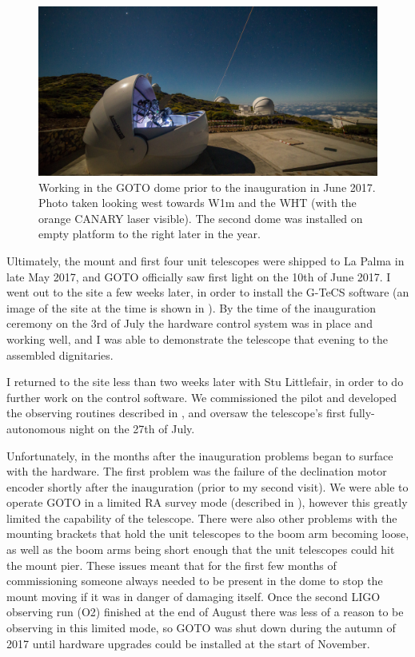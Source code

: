 \begin{colsection}
\begin{figure}[t]
    \begin{center}
        \includegraphics[width=\linewidth]{images/inauguration_photo.jpg}
    \end{center}
    \caption[Working in the GOTO dome prior to the inauguration in June 2017]{
        Working in the GOTO dome prior to the inauguration in June 2017.
        Photo taken looking west towards W1m and the WHT (with the orange CANARY laser visible). The second dome was installed on empty platform to the right later in the year.
    }\label{fig:inauguration}
\end{figure}

Ultimately, the mount and first four unit telescopes were shipped to La Palma in late May 2017, and GOTO officially saw first light on the 10th of June 2017. I went out to the site a few weeks later, in order to install the G-TeCS software (an image of the site at the time is shown in ). By the time of the inauguration ceremony on the 3rd of July the hardware control system was in place and working well, and I was able to demonstrate the telescope that evening to the assembled dignitaries.

I returned to the site less than two weeks later with Stu Littlefair, in order to do further work on the control software. We commissioned the pilot and developed the observing routines described in , and oversaw the telescope's first fully-autonomous night on the 27th of July.

Unfortunately, in the months after the inauguration problems began to surface with the hardware. The first problem was the failure of the declination motor encoder shortly after the inauguration (prior to my second visit). We were able to operate GOTO in a limited RA survey mode (described in ), however this greatly limited the capability of the telescope. There were also other problems with the mounting brackets that hold the unit telescopes to the boom arm becoming loose, as well as the boom arms being short enough that the unit telescopes could hit the mount pier. These issues meant that for the first few months of commissioning someone always needed to be present in the dome to stop the mount moving if it was in danger of damaging itself. Once the second LIGO observing run (O2) finished at the end of August there was less of a reason to be observing in this limited mode, so GOTO was shut down during the autumn of 2017 until hardware upgrades could be installed at the start of November.


\end{colsection}
